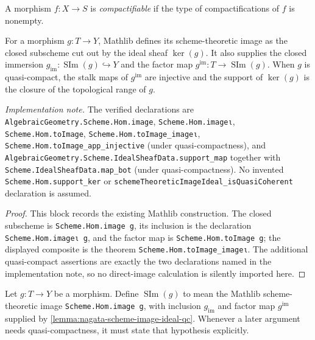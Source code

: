 \begin{definition}[Compactifiability]
  \label{def:nagata-compactifiable}
  \leanok

  A morphism $f\colon X\to S$ is \emph{compactifiable} if the type of
  compactifications of $f$ is nonempty.
\end{definition}

\begin{lemma}
  \label{lemma:nagata-scheme-image-ideal-qc}
  \leanok

  For a morphism $g\colon T\to Y$, Mathlib defines its scheme-theoretic image
  as the closed subscheme cut out by the ideal sheaf $\operatorname{ker}(g)$.
  It also supplies the closed immersion
  $g_{\mathrm{im}}\colon\operatorname{SIm}(g)\hookrightarrow Y$ and the
  factor map $g^{\mathrm{im}}\colon T\to\operatorname{SIm}(g)$.
  When $g$ is quasi-compact, the stalk maps of $g^{\mathrm{im}}$ are
  injective and the support of $\operatorname{ker}(g)$ is the closure of the
  topological range of $g$.

  \emph{Implementation note.}  The verified declarations are
  \texttt{AlgebraicGeometry.Scheme.Hom.image}, \texttt{Scheme.Hom.imageι},
  \texttt{Scheme.Hom.toImage}, \texttt{Scheme.Hom.toImage_imageι},
  \texttt{Scheme.Hom.toImage\_app\_injective} (under quasi-compactness), and
  \texttt{AlgebraicGeometry.Scheme.IdealSheafData.support\_map} together with
  \texttt{Scheme.IdealSheafData.map\_bot} (under quasi-compactness).  No
  invented \texttt{Scheme.Hom.support\_ker} or
  \texttt{schemeTheoreticImageIdeal\_isQuasiCoherent} declaration is assumed.
\end{lemma}

\begin{proof}
  \leanok
  This block records the existing Mathlib construction.  The closed
  subscheme is \texttt{Scheme.Hom.image g}, its inclusion is the declaration
  \texttt{Scheme.Hom.imageι g}, and the factor map is
  \texttt{Scheme.Hom.toImage g}; the displayed composite is the theorem
  \texttt{Scheme.Hom.toImage_imageι}.  The additional quasi-compact
  assertions are exactly the two declarations named in the implementation
  note, so no direct-image calculation is silently imported here.
\end{proof}

\begin{definition}
  \label{def:nagata-scheme-theoretic-image}
  \leanok

  Let $g\colon T\to Y$ be a morphism.  Define
  $\operatorname{SIm}(g)$ to mean the Mathlib scheme-theoretic image
  \texttt{Scheme.Hom.image g}, with inclusion $g_{\mathrm{im}}$ and factor map
  $g^{\mathrm{im}}$ supplied by
  \ref{lemma:nagata-scheme-image-ideal-qc}.  Whenever a later argument needs
  quasi-compactness, it must state that hypothesis explicitly.
\end{definition}

